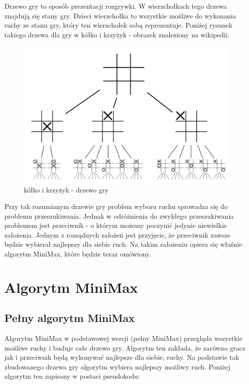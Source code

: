\documentclass[polish,shortabstract,inz]{iithesis}
\begin{document}
Drzewo gry to sposób prezentacji rozgrywki.
W wierzchołkach tego drzewa znajdują się stany gry.
Dzieci wierzchołka to wszystkie możliwe do wykonania ruchy ze stanu gry, który ten wierzchołek sobą reprezentuje.
Poniżej rysunek takiego drzewa dla gry w kółko i krzyżyk - obrazek znaleziony na wikipedii.


\begin{figure}[H]
  \includegraphics[scale=0.3]{./images/tictactoetree.png}
  \centering
  \caption{kółko i krzyżyk - drzewo gry}
  \label{fig:ox_tree}
\end{figure}

Przy tak rozumianym drzewie gry problem wyboru ruchu sprowadza się do problemu przeszukiwania.
Jednak w odróżnienia do zwykłego przeszukiwania problemem jest przeciwnik - o którym możemy poczynić jedynie niewielkie założenia.
Jednym z rozsądnych założeń jest przyjęcie, że przeciwnik zawsze będzie wybierał najlepszy dla siebie ruch.
Na takim założeniu opiera się właśnie algorytm MiniMax, które będzie teraz omówiony.


\section{Algorytm MiniMax}
\subsection{Pełny algorytm MiniMax}
Algorytm MiniMax w podstawowej wersji (pełny MiniMax) przegląda wszystkie możliwe ruchy i buduje całe drzewo gry.
Algorytm ten zakłada, że zarówno gracz jak i przeciwnik będą wykonywać najlepsze dla siebie, ruchy.
Na podstawie tak zbudowanego drzewa gry algorytm wybiera najlepszy możliwy ruch.
Poniżej algorytm ten zapisany w postaci pseudokodu:
\end{document}

